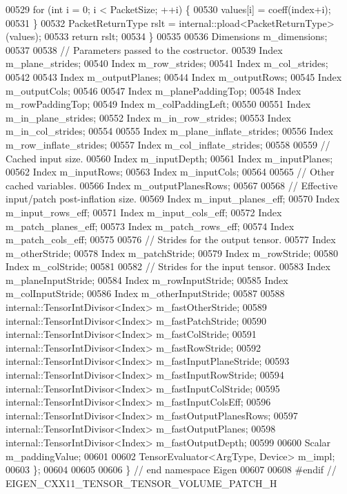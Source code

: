 \begin{DoxyCode}
00529     \textcolor{keywordflow}{for} (\textcolor{keywordtype}{int} i = 0; i < PacketSize; ++i) \{
00530       values[i] = coeff(index+i);
00531     \}
00532     PacketReturnType rslt = internal::pload<PacketReturnType>(values);
00533     \textcolor{keywordflow}{return} rslt;
00534   \}
00535 
00536   Dimensions m\_dimensions;
00537 
00538   \textcolor{comment}{// Parameters passed to the costructor.}
00539   Index m\_plane\_strides;
00540   Index m\_row\_strides;
00541   Index m\_col\_strides;
00542 
00543   Index m\_outputPlanes;
00544   Index m\_outputRows;
00545   Index m\_outputCols;
00546 
00547   Index m\_planePaddingTop;
00548   Index m\_rowPaddingTop;
00549   Index m\_colPaddingLeft;
00550 
00551   Index m\_in\_plane\_strides;
00552   Index m\_in\_row\_strides;
00553   Index m\_in\_col\_strides;
00554 
00555   Index m\_plane\_inflate\_strides;
00556   Index m\_row\_inflate\_strides;
00557   Index m\_col\_inflate\_strides;
00558 
00559   \textcolor{comment}{// Cached input size.}
00560   Index m\_inputDepth;
00561   Index m\_inputPlanes;
00562   Index m\_inputRows;
00563   Index m\_inputCols;
00564 
00565   \textcolor{comment}{// Other cached variables.}
00566   Index m\_outputPlanesRows;
00567 
00568   \textcolor{comment}{// Effective input/patch post-inflation size.}
00569   Index m\_input\_planes\_eff;
00570   Index m\_input\_rows\_eff;
00571   Index m\_input\_cols\_eff;
00572   Index m\_patch\_planes\_eff;
00573   Index m\_patch\_rows\_eff;
00574   Index m\_patch\_cols\_eff;
00575 
00576   \textcolor{comment}{// Strides for the output tensor.}
00577   Index m\_otherStride;
00578   Index m\_patchStride;
00579   Index m\_rowStride;
00580   Index m\_colStride;
00581 
00582   \textcolor{comment}{// Strides for the input tensor.}
00583   Index m\_planeInputStride;
00584   Index m\_rowInputStride;
00585   Index m\_colInputStride;
00586   Index m\_otherInputStride;
00587 
00588   internal::TensorIntDivisor<Index> m\_fastOtherStride;
00589   internal::TensorIntDivisor<Index> m\_fastPatchStride;
00590   internal::TensorIntDivisor<Index> m\_fastColStride;
00591   internal::TensorIntDivisor<Index> m\_fastRowStride;
00592   internal::TensorIntDivisor<Index> m\_fastInputPlaneStride;
00593   internal::TensorIntDivisor<Index> m\_fastInputRowStride;
00594   internal::TensorIntDivisor<Index> m\_fastInputColStride;
00595   internal::TensorIntDivisor<Index> m\_fastInputColsEff;
00596   internal::TensorIntDivisor<Index> m\_fastOutputPlanesRows;
00597   internal::TensorIntDivisor<Index> m\_fastOutputPlanes;
00598   internal::TensorIntDivisor<Index> m\_fastOutputDepth;
00599 
00600   Scalar m\_paddingValue;
00601 
00602   TensorEvaluator<ArgType, Device> m\_impl;
00603 \};
00604 
00605 
00606 \} \textcolor{comment}{// end namespace Eigen}
00607 
00608 \textcolor{preprocessor}{#endif // EIGEN\_CXX11\_TENSOR\_TENSOR\_VOLUME\_PATCH\_H}
\end{DoxyCode}
